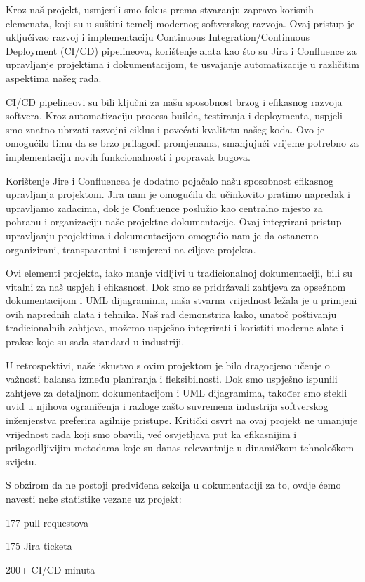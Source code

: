 		Kroz naš projekt, usmjerili smo fokus prema stvaranju zapravo korisnih elemenata, koji su u suštini temelj modernog softverskog razvoja. Ovaj pristup je uključivao razvoj i implementaciju Continuous Integration/Continuous Deployment (CI/CD) pipelineova, korištenje alata kao što su Jira i Confluence za upravljanje projektima i dokumentacijom, te usvajanje automatizacije u različitim aspektima našeg rada.

		CI/CD pipelineovi su bili ključni za našu sposobnost brzog i efikasnog razvoja softvera. Kroz automatizaciju procesa builda, testiranja i deploymenta, uspjeli smo znatno ubrzati razvojni ciklus i povećati kvalitetu našeg koda. Ovo je omogućilo timu da se brzo prilagodi promjenama, smanjujući vrijeme potrebno za implementaciju novih funkcionalnosti i popravak bugova.

		Korištenje Jire i Confluencea je dodatno pojačalo našu sposobnost efikasnog upravljanja projektom. Jira nam je omogućila da učinkovito pratimo napredak i upravljamo zadacima, dok je Confluence poslužio kao centralno mjesto za pohranu i organizaciju naše projektne dokumentacije. Ovaj integrirani pristup upravljanju projektima i dokumentacijom omogućio nam je da ostanemo organizirani, transparentni i usmjereni na ciljeve projekta.

		Ovi elementi projekta, iako manje vidljivi u tradicionalnoj dokumentaciji, bili su vitalni za naš uspjeh i efikasnost. Dok smo se pridržavali zahtjeva za opsežnom dokumentacijom i UML dijagramima, naša stvarna vrijednost ležala je u primjeni ovih naprednih alata i tehnika. Naš rad demonstrira kako, unatoč poštivanju tradicionalnih zahtjeva, možemo uspješno integrirati i koristiti moderne alate i prakse koje su sada standard u industriji.

		U retrospektivi, naše iskustvo s ovim projektom je bilo dragocjeno učenje o važnosti balansa između planiranja i fleksibilnosti. Dok smo uspješno ispunili zahtjeve za detaljnom dokumentacijom i UML dijagramima, također smo stekli uvid u njihova ograničenja i razloge zašto suvremena industrija softverskog inženjerstva preferira agilnije pristupe. Kritički osvrt na ovaj projekt ne umanjuje vrijednost rada koji smo obavili, već osvjetljava put ka efikasnijim i prilagodljivijim metodama koje su danas relevantnije u dinamičkom tehnološkom svijetu.
		
		S obzirom da ne postoji predviđena sekcija u dokumentaciji za to, ovdje ćemo navesti neke statistike vezane uz projekt:
		\begin{packed_item}
			\item 177 pull requestova
			\item 175 Jira ticketa
			\item 200+ CI/CD minuta
		\end{packed_item}
		\eject 